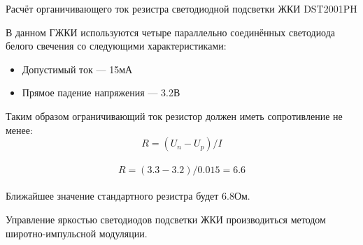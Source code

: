 Расчёт органичивающего ток резистра светодиодной подсветки ЖКИ DST2001PH

\begin{par}
В данном ГЖКИ используются четыре параллельно соединённых светодиода белого свечения со следующими характеристиками:
\begin{itemize}
    \item{}Допустимый ток --- 15мА
    \item{}Прямое падение напряжения --- 3.2В
\end{itemize}

Таким образом ограничивающий ток резистор должен иметь сопротивление не менее: \\
$$R = (U_n - U_p) / I$$ \\
$$R = (3.3 - 3.2) / 0.015 = 6.6$$ \\
Ближайшее значение стандартного резистра будет 6.8Ом.

\end{par}


Управление яркостью светодиодов подсветки ЖКИ производиться методом широтно-импульсной модуляции.
